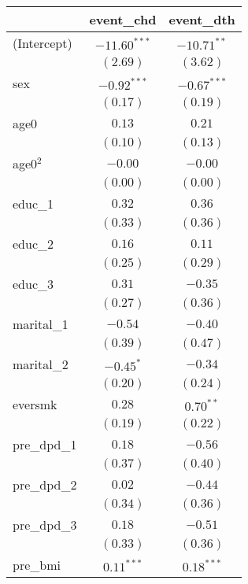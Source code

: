 
\begin{tabular}{l c c}
\toprule
 & event_chd & event_dth \\
\midrule
(Intercept)      & $-11.60^{***}$ & $-10.71^{**}$ \\
                 & $(2.69)$       & $(3.62)$      \\
sex              & $-0.92^{***}$  & $-0.67^{***}$ \\
                 & $(0.17)$       & $(0.19)$      \\
age0             & $0.13$         & $0.21$        \\
                 & $(0.10)$       & $(0.13)$      \\
age0$^2$         & $-0.00$        & $-0.00$       \\
                 & $(0.00)$       & $(0.00)$      \\
educ\_1          & $0.32$         & $0.36$        \\
                 & $(0.33)$       & $(0.36)$      \\
educ\_2          & $0.16$         & $0.11$        \\
                 & $(0.25)$       & $(0.29)$      \\
educ\_3          & $0.31$         & $-0.35$       \\
                 & $(0.27)$       & $(0.36)$      \\
marital\_1       & $-0.54$        & $-0.40$       \\
                 & $(0.39)$       & $(0.47)$      \\
marital\_2       & $-0.45^{*}$    & $-0.34$       \\
                 & $(0.20)$       & $(0.24)$      \\
eversmk          & $0.28$         & $0.70^{**}$   \\
                 & $(0.19)$       & $(0.22)$      \\
pre\_dpd\_1      & $0.18$         & $-0.56$       \\
                 & $(0.37)$       & $(0.40)$      \\
pre\_dpd\_2      & $0.02$         & $-0.44$       \\
                 & $(0.34)$       & $(0.36)$      \\
pre\_dpd\_3      & $0.18$         & $-0.51$       \\
                 & $(0.33)$       & $(0.36)$      \\
pre\_bmi         & $0.11^{***}$   & $0.18^{***}$  \\

\end{tabular}
